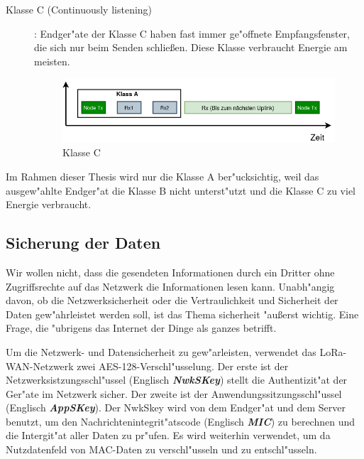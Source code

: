 \begin{description}
	\vspace{10cm}
	\item [Klasse C (Continuously listening)]: Endger"ate der Klasse C 
	haben fast immer ge"offnete Empfangsfenster, die sich nur beim 
	Senden schlie\ss{}en. Diese Klasse verbraucht Energie am meisten.
	
	\begin{figure}[h]
		\centering
		\includegraphics[width=13cm]{source/images/ClassC}
		\caption{Klasse C \label{fig:classC}}
	\end{figure}

\end{description}


Im Rahmen dieser Thesis wird nur die Klasse A ber"ucksichtig, weil das 
ausgew"ahlte Endger"at die Klasse B nicht unterst"utzt und die Klasse C 
zu viel Energie verbraucht. 

\subsection{Sicherung der Daten}\label{secure}

Wir wollen nicht, dass die gesendeten Informationen durch ein Dritter 
ohne Zugriffsrechte auf das Netzwerk die Informationen lesen kann. 
Unabh"angig davon, ob die Netzwerksicherheit oder die Vertraulichkeit 
und Sicherheit der Daten gew"ahrleistet werden soll, ist das Thema 
sicherheit "au\ss{}erst wichtig. Eine Frage, die "ubrigens das 
Internet der Dinge als ganzes betrifft.

Um die Netzwerk- und Datensicherheit zu gew"arleisten, verwendet das 
LoRa-WAN-Netzwerk zwei AES-128-Verschl"usselung. Der erste ist der 
Netzwerksistzungsschl"ussel (Englisch \textbf{\textit{\ac{NwkSKey}}}) 
stellt die Authentizit"at der Ger"ate im Netzwerk sicher. Der zweite 
ist der Anwendungssitzungsschl"ussel (Englisch  
\textbf{\textit{\ac{AppSKey}}}). Der NwkSkey wird von dem 
Endger"at und dem Server benutzt, um den Nachrichtenintegrit"atscode 
(Englisch \textbf{\textit{\ac{MIC}}}) zu berechnen und die Intergit"at 
aller Daten zu pr"ufen.  Es wird weiterhin verwendet, um da  
Nutzdatenfeld von \ac{MAC}-Daten zu verschl"usseln und zu entschl"usseln. 

